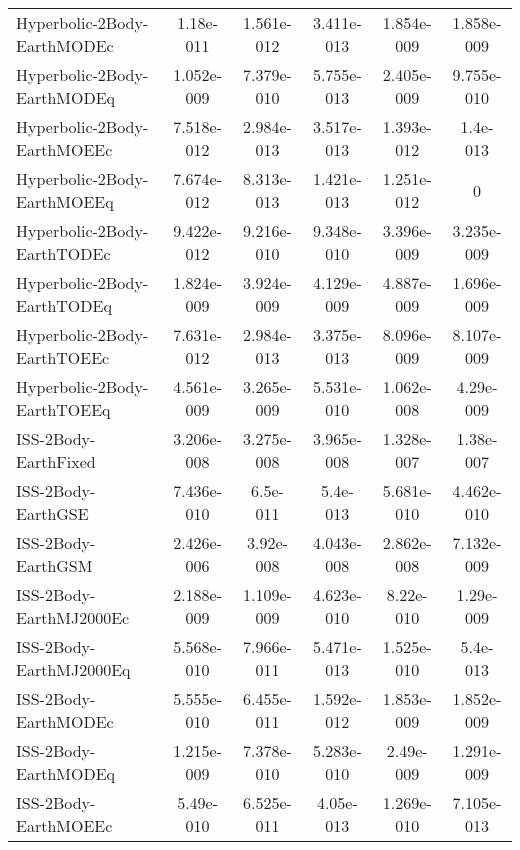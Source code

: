 \begin{table}[htbp!]
\begin{tabular}{lccccc}
         Hyperbolic-2Body-EarthMODEc & 1.18e-011 & 1.561e-012 & 3.411e-013 & 1.854e-009 & 1.858e-009 \\
         Hyperbolic-2Body-EarthMODEq & 1.052e-009 & 7.379e-010 & 5.755e-013 & 2.405e-009 & 9.755e-010 \\
         Hyperbolic-2Body-EarthMOEEc & 7.518e-012 & 2.984e-013 & 3.517e-013 & 1.393e-012 & 1.4e-013 \\
         Hyperbolic-2Body-EarthMOEEq & 7.674e-012 & 8.313e-013 & 1.421e-013 & 1.251e-012 & 0 \\
         Hyperbolic-2Body-EarthTODEc & 9.422e-012 & 9.216e-010 & 9.348e-010 & 3.396e-009 & 3.235e-009 \\
         Hyperbolic-2Body-EarthTODEq & 1.824e-009 & 3.924e-009 & 4.129e-009 & 4.887e-009 & 1.696e-009 \\
         Hyperbolic-2Body-EarthTOEEc & 7.631e-012 & 2.984e-013 & 3.375e-013 & 8.096e-009 & 8.107e-009 \\
         Hyperbolic-2Body-EarthTOEEq & 4.561e-009 & 3.265e-009 & 5.531e-010 & 1.062e-008 & 4.29e-009 \\
         ISS-2Body-EarthFixed & 3.206e-008 & 3.275e-008 & 3.965e-008 & 1.328e-007 & 1.38e-007 \\
         ISS-2Body-EarthGSE & 7.436e-010 & 6.5e-011 & 5.4e-013 & 5.681e-010 & 4.462e-010 \\
         ISS-2Body-EarthGSM & 2.426e-006 & 3.92e-008 & 4.043e-008 & 2.862e-008 & 7.132e-009 \\
         ISS-2Body-EarthMJ2000Ec & 2.188e-009 & 1.109e-009 & 4.623e-010 & 8.22e-010 & 1.29e-009 \\
         ISS-2Body-EarthMJ2000Eq & 5.568e-010 & 7.966e-011 & 5.471e-013 & 1.525e-010 & 5.4e-013 \\
         ISS-2Body-EarthMODEc & 5.555e-010 & 6.455e-011 & 1.592e-012 & 1.853e-009 & 1.852e-009 \\
         ISS-2Body-EarthMODEq & 1.215e-009 & 7.378e-010 & 5.283e-010 & 2.49e-009 & 1.291e-009 \\
         ISS-2Body-EarthMOEEc & 5.49e-010 & 6.525e-011 & 4.05e-013 & 1.269e-010 & 7.105e-013 \\

\end{tabular}
\end{table}
